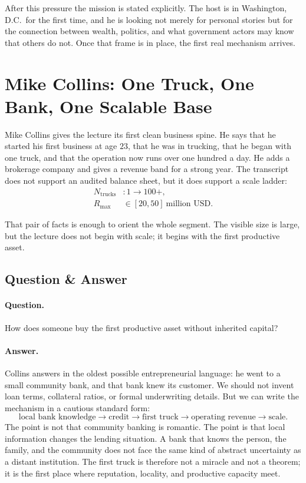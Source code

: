 After this pressure the mission is stated explicitly. The host is in Washington, D.C.\ for the first time, and he is looking not merely for personal stories but for the connection between wealth, politics, and what government actors may know that others do not. Once that frame is in place, the first real mechanism arrives.

\section{Mike Collins: One Truck, One Bank, One Scalable Base}

Mike Collins gives the lecture its first clean business spine. He says that he started his first business at age $23$, that he was in trucking, that he began with one truck, and that the operation now runs over one hundred a day. He adds a brokerage company and gives a revenue band for a strong year. The transcript does not support an audited balance sheet, but it does support a scale ladder:
\begin{align}
N_{\text{trucks}} &: 1 \to 100+,\\
R_{\max} &\in [20,50]\ \text{million USD}.
\end{align}

That pair of facts is enough to orient the whole segment. The visible size is large, but the lecture does not begin with scale; it begins with the first productive asset.

\subsection{Question \& Answer}

\paragraph{Question.} How does someone buy the first productive asset without inherited capital?

\paragraph{Answer.} Collins answers in the oldest possible entrepreneurial language: he went to a small community bank, and that bank knew its customer. We should not invent loan terms, collateral ratios, or formal underwriting details. But we can write the mechanism in a cautious standard form:
\begin{equation}
\text{local bank knowledge}\to \text{credit}\to \text{first truck}\to \text{operating revenue}\to \text{scale}.
\end{equation}
The point is not that community banking is romantic. The point is that local information changes the lending situation. A bank that knows the person, the family, and the community does not face the same kind of abstract uncertainty as a distant institution. The first truck is therefore not a miracle and not a theorem; it is the first place where reputation, locality, and productive capacity meet.

